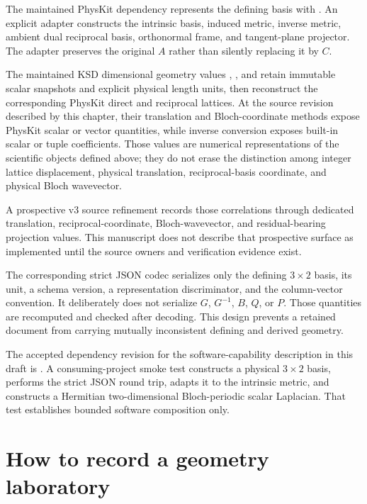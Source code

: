 The maintained PhysKit dependency represents the defining basis with
. An explicit adapter constructs the intrinsic
basis, induced metric, inverse metric, ambient dual reciprocal basis,
orthonormal frame, and tangent-plane projector. The adapter preserves the
original $A$ rather than silently replacing it by $C$.

The maintained KSD dimensional geometry values
, , and
 retain immutable scalar snapshots and explicit
physical length units, then reconstruct the corresponding PhysKit direct and
reciprocal lattices. At the source revision described by this chapter, their
translation and Bloch-coordinate methods expose PhysKit scalar or vector
quantities, while inverse conversion exposes built-in scalar or tuple
coefficients. Those values are numerical representations of the scientific
objects defined above; they do not erase the distinction among integer lattice
displacement, physical translation, reciprocal-basis coordinate, and physical
Bloch wavevector.

A prospective v3 source refinement records those correlations through dedicated
translation, reciprocal-coordinate, Bloch-wavevector, and residual-bearing
projection values. This manuscript does not describe that prospective surface
as implemented until the source owners and verification evidence exist.

The corresponding strict JSON codec serializes only the defining $3\times2$
basis, its unit, a schema version, a representation discriminator, and the
column-vector convention. It deliberately does not serialize $G$, $G^{-1}$,
$B$, $Q$, or $P$. Those quantities are recomputed and checked after decoding.
This design prevents a retained document from carrying mutually inconsistent
defining and derived geometry.

The accepted dependency revision for the software-capability description in
this draft is
. A consuming-project smoke test
constructs a physical $3\times2$ basis, performs the strict JSON round trip,
adapts it to the intrinsic metric, and constructs a Hermitian two-dimensional
Bloch-periodic scalar Laplacian. That test establishes bounded software
composition only.

\section{How to record a geometry laboratory}

